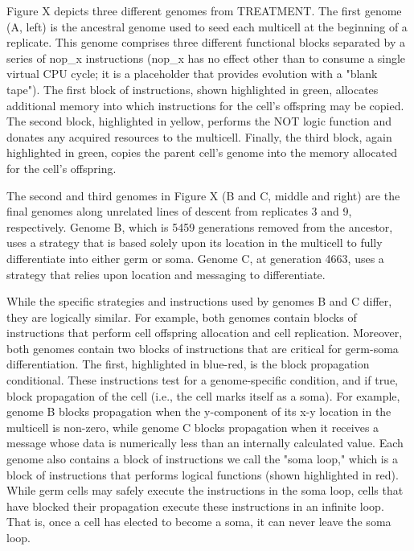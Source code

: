 Figure X depicts three different genomes from TREATMENT.  The first genome (A, left) is the ancestral genome used to seed each multicell at the beginning of a replicate.  This genome comprises three different functional blocks separated by a series of nop_x instructions (nop_x has no effect other than to consume a single virtual CPU cycle; it is a placeholder that provides evolution with a "blank tape").  The first block of instructions, shown highlighted in green, allocates additional memory into which instructions for the cell's offspring may be copied.  The second block, highlighted in yellow, performs the NOT logic function and donates any acquired resources to the multicell.  Finally, the third block, again highlighted in green, copies the parent cell's genome into the memory allocated for the cell's offspring.

The second and third genomes in Figure X (B and C, middle and right) are the final genomes along unrelated lines of descent from replicates 3 and 9, respectively.  Genome B, which is 5459 generations removed from the ancestor, uses a strategy that is based solely upon its location in the multicell to fully differentiate into either germ or soma.  Genome C, at generation 4663, uses a strategy that relies upon location and messaging to differentiate.

While the specific strategies and instructions used by genomes B and C differ, they are logically similar.  For example, both genomes contain blocks of instructions that perform cell offspring allocation and cell replication.  Moreover, both genomes contain two blocks of instructions that are critical for germ-soma differentiation.  The first, highlighted in blue-red, is the block propagation conditional.  These instructions test for a genome-specific condition, and if true, block propagation of the cell (i.e., the cell marks itself as a soma).  For example, genome B blocks propagation when the y-component of its x-y location in the multicell is non-zero, while genome C blocks propagation when it receives a message whose data is numerically less than an internally calculated value.  Each genome also contains a block of instructions we call the "soma loop," which is a block of instructions that performs logical functions (shown highlighted in red).  While germ cells may safely execute the instructions in the soma loop, cells that have blocked their propagation execute these instructions in an infinite loop.  That is, once a cell has elected to become a soma, it can never leave the soma loop.

